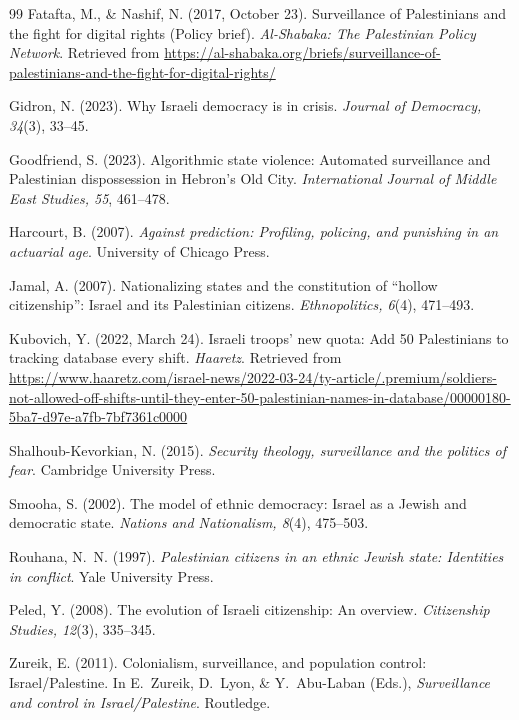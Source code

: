 \documentclass[11pt,a4paper]{article}
\theoremstyle{definition}
\theoremstyle{remark}
\theoremstyle{definition}
\begin{document}
\begin{thebibliography}{99}
Fatafta, M., \& Nashif, N. (2017, October 23).
\newblock Surveillance of Palestinians and the fight for digital rights (Policy brief).
\newblock \emph{Al-Shabaka: The Palestinian Policy Network}. Retrieved from \url{https://al-shabaka.org/briefs/surveillance-of-palestinians-and-the-fight-for-digital-rights/}

Gidron, N. (2023).
\newblock Why Israeli democracy is in crisis.
\newblock \emph{Journal of Democracy, 34}(3), 33--45.

Goodfriend, S. (2023).
\newblock Algorithmic state violence: Automated surveillance and Palestinian dispossession in Hebron's Old City.
\newblock \emph{International Journal of Middle East Studies, 55}, 461--478.

Harcourt, B. (2007).
\newblock \emph{Against prediction: Profiling, policing, and punishing in an actuarial age}.
\newblock University of Chicago Press.

Jamal, A. (2007).
\newblock Nationalizing states and the constitution of ``hollow citizenship'': Israel and its Palestinian citizens.
\newblock \emph{Ethnopolitics, 6}(4), 471--493.

Kubovich, Y. (2022, March 24).
\newblock Israeli troops' new quota: Add 50 Palestinians to tracking database every shift.
\newblock \emph{Haaretz}. Retrieved from \url{https://www.haaretz.com/israel-news/2022-03-24/ty-article/.premium/soldiers-not-allowed-off-shifts-until-they-enter-50-palestinian-names-in-database/00000180-5ba7-d97e-a7fb-7bf7361c0000}

Shalhoub-Kevorkian, N. (2015).
\newblock \emph{Security theology, surveillance and the politics of fear}.
\newblock Cambridge University Press.

Smooha, S. (2002).
\newblock The model of ethnic democracy: Israel as a Jewish and democratic state.
\newblock \emph{Nations and Nationalism, 8}(4), 475--503.

Rouhana, N.~N. (1997).
\newblock \emph{Palestinian citizens in an ethnic Jewish state: Identities in conflict}.
\newblock Yale University Press.

Peled, Y. (2008).
\newblock The evolution of Israeli citizenship: An overview.
\newblock \emph{Citizenship Studies, 12}(3), 335--345.

Zureik, E. (2011).
\newblock Colonialism, surveillance, and population control: Israel/Palestine.
\newblock In E.~Zureik, D.~Lyon, \& Y.~Abu-Laban (Eds.), \emph{Surveillance and control in Israel/Palestine}.
\newblock Routledge.

\end{thebibliography}
\end{document}
